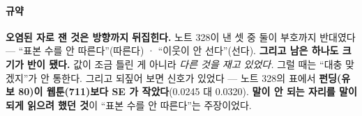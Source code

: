 \documentclass[10pt]{article}
\begin{document}
\paragraph{규약} \textbf{오염된 자로 잰 것은 방향까지 뒤집힌다.} 노트 328이
낸 셋 중 둘이 부호까지 반대였다 --- ``표본 수를 안 따른다''(따른다) ·
``이웃이 안 선다''(선다). \textbf{그리고 남은 하나도 크기가 반이 됐다.}
값이 조금 틀린 게 아니라 \emph{다른 것을 재고 있었다.} 그럴 때는 ``대충
맞겠지''가 안 통한다. 그리고 되짚어 보면 신호가 있었다 --- 노트 328의
표에서 \textbf{펀딩(유보 80)이 웹툰(711)보다 SE 가 작았다}(0.0245 대
0.0320). \textbf{말이 안 되는 자리를 말이 되게 읽으려 했던 것}이
``표본 수를 안 따른다''는 주장이었다.
\end{document}
